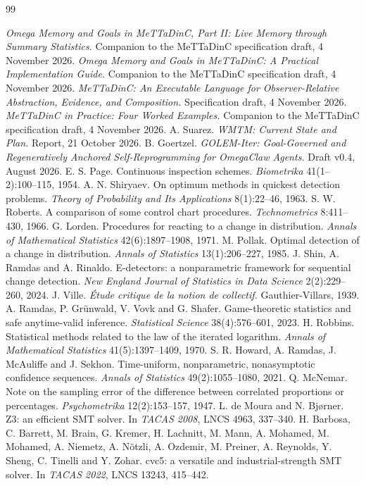 \documentclass[11pt]{article}
\theoremstyle{definition}
\theoremstyle{plain}
\begin{document}
\begin{thebibliography}{99}\small
{}
 \emph{Omega Memory and Goals in MeTTaDinC, Part II: Live Memory through Summary
Statistics.} Companion to the MeTTaDinC specification draft, 4 November 2026.
 \emph{Omega Memory and Goals in MeTTaDinC: A Practical Implementation Guide.} Companion
to the MeTTaDinC specification draft, 4 November 2026.
 \emph{MeTTaDinC: An Executable Language for Observer-Relative Abstraction, Evidence,
and Composition.} Specification draft, 4 November 2026.
 \emph{MeTTaDinC in Practice: Four Worked Examples.} Companion to the MeTTaDinC
specification draft, 4 November 2026.
 A. Suarez. \emph{WMTM: Current State and Plan.} Report, 21 October 2026.
 B. Goertzel. \emph{GOLEM-Iter: Goal-Governed and Regeneratively Anchored
Self-Reprogramming for OmegaClaw Agents.} Draft v0.4, August 2026.
 E. S. Page. Continuous inspection schemes. \emph{Biometrika} 41(1--2):100--115,
1954.
 A. N. Shiryaev. On optimum methods in quickest detection problems. \emph{Theory
of Probability and Its Applications} 8(1):22--46, 1963.
 S. W. Roberts. A comparison of some control chart procedures.
\emph{Technometrics} 8:411--430, 1966.
 G. Lorden. Procedures for reacting to a change in distribution. \emph{Annals of
Mathematical Statistics} 42(6):1897--1908, 1971.
 M. Pollak. Optimal detection of a change in distribution. \emph{Annals of
Statistics} 13(1):206--227, 1985.
 J. Shin, A. Ramdas and A. Rinaldo. E-detectors: a nonparametric framework for
sequential change detection. \emph{New England Journal of Statistics in Data Science}
2(2):229--260, 2024.
 J. Ville. \emph{\'Etude critique de la notion de collectif.} Gauthier-Villars, 1939.
 A. Ramdas, P. Gr\"unwald, V. Vovk and G. Shafer. Game-theoretic statistics and
safe anytime-valid inference. \emph{Statistical Science} 38(4):576--601, 2023.
 H. Robbins. Statistical methods related to the law of the iterated logarithm.
\emph{Annals of Mathematical Statistics} 41(5):1397--1409, 1970.
 S. R. Howard, A. Ramdas, J. McAuliffe and J. Sekhon. Time-uniform, nonparametric,
nonasymptotic confidence sequences. \emph{Annals of Statistics} 49(2):1055--1080, 2021.
 Q. McNemar. Note on the sampling error of the difference between correlated
proportions or percentages. \emph{Psychometrika} 12(2):153--157, 1947.
 L. de Moura and N. Bj\o rner. Z3: an efficient SMT solver. In \emph{TACAS 2008}, LNCS
4963, 337--340.
 H. Barbosa, C. Barrett, M. Brain, G. Kremer, H. Lachnitt, M. Mann, A. Mohamed,
M. Mohamed, A. Niemetz, A. N\"otzli, A. Ozdemir, M. Preiner, A. Reynolds, Y. Sheng, C. Tinelli and
Y. Zohar. cvc5: a versatile and industrial-strength SMT solver. In \emph{TACAS 2022}, LNCS 13243,
415--442.
\end{thebibliography}
\clearpage
\appendix
\end{document}
